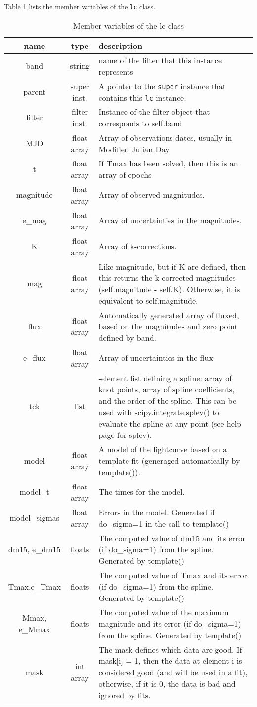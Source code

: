 \documentclass[12pt]{article}
\providecommand{\tabularnewline}{\\}
\begin{document}
Table \ref{tab:lc_member_var} lists the member variables of the \texttt{lc}
class. 

%
\begin{table}
\begin{tabular}{|c|c|>{\centering}p{4in}|}
\hline 
name&
type&
description\tabularnewline
\hline
\hline 
band&
string&
name of the filter that this instance represents\tabularnewline
\hline 
parent&
super inst.&
A pointer to the \texttt{super} instance that contains this \texttt{lc}
instance.\tabularnewline
\hline 
filter&
filter inst.&
Instance of the filter object that corresponds to self.band\tabularnewline
\hline 
MJD&
float array&
Array of observations dates, usually in Modified Julian Day\tabularnewline
\hline 
t&
float array&
If Tmax has been solved, then this is an array of epochs\tabularnewline
\hline 
magnitude&
float array&
Array of observed magnitudes.\tabularnewline
\hline 
e\_mag&
float array&
Array of uncertainties in the magnitudes.\tabularnewline
\hline 
K&
float array&
Array of k-corrections.\tabularnewline
\hline 
mag&
float array&
Like magnitude, but if K are defined, then this returns the k-corrected
magnitudes (self.magnitude - self.K). Otherwise, it is equivalent
to self.magnitude.\tabularnewline
\hline 
flux&
float array&
Automatically generated array of fluxed, based on the magnitudes and
zero point defined by band.\tabularnewline
\hline 
e\_flux&
float array&
Array of uncertainties in the flux.\tabularnewline
\hline 
tck&
list&
3-element list defining a spline: array of knot points, array of spline
coefficients, and the order of the spline. This can be used with scipy.integrate.splev()
to evaluate the spline at any point (see help page for splev).\tabularnewline
\hline 
model&
float array&
A model of the lightcurve based on a template fit (generaged automatically
by template()).\tabularnewline
\hline 
model\_t&
float array&
The times for the model.\tabularnewline
\hline 
model\_sigmas&
float array&
Errors in the model. Generated if do\_sigma=1 in the call to template() \tabularnewline
\hline 
dm15, e\_dm15&
floats&
The computed value of dm15 and its error (if do\_sigma=1) from the
spline. Generated by template()\tabularnewline
\hline 
Tmax,e\_Tmax&
floats&
The computed value of Tmax and its error (if do\_sigma=1) from the
spline. Generated by template()\tabularnewline
\hline 
Mmax, e\_Mmax&
floats&
The computed value of the maximum magnitude and its error (if do\_sigma=1)
from the spline. Generated by template()\tabularnewline
\hline 
mask&
int array&
The mask defines which data are good. If mask{[}i] = 1, then the data
at element i is considered good (and will be used in a fit), otherwise,
if it is 0, the data is bad and ignored by fits.\tabularnewline
\hline
\end{tabular}


\caption{Member variables of the lc class\label{tab:lc_member_var}}
\end{table}
\end{document}
